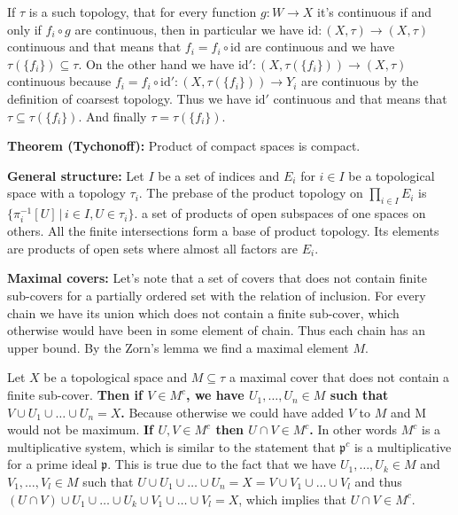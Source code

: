 \documentclass{article}
\begin{document}
If $\tau$ is a such topology, that for every function $g:W\rightarrow X$ it's
continuous if and only if $f_i\circ g$ are continuous, then in particular we
have $\text{id}:(X,\tau)\rightarrow(X,\tau)$ continuous and that means that $f_i = f_i\circ
\text{id}$ are continuous and we have $\tau(\{f_i\})\subseteq\tau$. On the other
hand we have $\text{id}':(X,\tau(\{f_i\}))\rightarrow(X,\tau)$ continuous
because $f_i = f_i\circ\text{id}':(X,\tau(\{f_i\}))\rightarrow Y_i$ are continuous
by the definition of coarsest topology. Thus we have $\text{id}'$ continuous
and that means that $\tau\subseteq\tau(\{f_i\})$. And finally $\tau=\tau(\{f_i\})$.

\vspace{1ex}

\textbf{Theorem (Tychonoff):} Product of compact spaces is compact.
\vspace{1ex}

\textbf{General structure:} Let $I$ be a set of indices and $E_i$ for $i\in I$
be a topological space with a topology $\tau_i$. The prebase of the product
topology on  $\prod_{i\in I} E_i$ is $\{\pi_i^{-1}[U]\,|\,i\in I,U\in\tau_i\}$.
a set of products of open subspaces of one spaces on others. All the finite
intersections form a base of product topology. Its elements are products of
open sets where almost all factors are $E_i$.
\vspace{1ex}

\textbf{Maximal covers:} Let's note that a set of covers that does not contain
finite sub-covers for a partially ordered set with the relation of inclusion.
For every chain we have its union which does not contain a finite sub-cover,
which otherwise would have been in some element of chain. Thus each chain has an
upper bound. By the Zorn's lemma we find a maximal element $M$.
\vspace{1ex}

Let $X$ be a topological space and $M\subseteq\tau$ a maximal cover that does
not contain a finite sub-cover. \textbf{Then if $V\in M^c$, we have $U_1,\ldots,
U_n\in M$ such that $V\cup U_1\cup\ldots\cup U_n=X$.} Because otherwise we
could have added $V$ to $M$ and M would not be maximum. \textbf{If
$U,V\in M^c$ then $U\cap V\in M^c$.} In other words $M^c$ is a multiplicative
system, which is similar to the statement that $\mathfrak{p}^c$ is a multiplicative
for a prime ideal $\mathfrak{p}$. This is true due to the fact that we have
$U_1,\ldots,U_k\in M$ and $V_1,\ldots,V_l\in M$ such that $U\cup U_1\cup\ldots
\cup U_n = X = V\cup V_1\cup\ldots\cup V_l$ and thus $(U\cap V)\cup U_1\cup\ldots
\cup U_k\cup V_1\cup\ldots\cup V_l=X$, which implies that $U\cap V\in M^c$.
\vspace{1ex}
\end{document}
